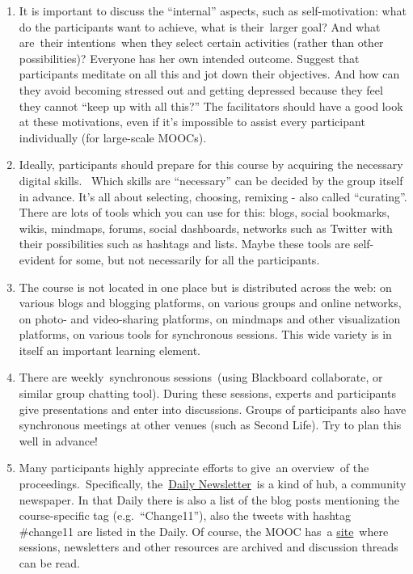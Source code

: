\begin{enumerate}
\def\labelenumi{\arabic{enumi}.}
\item
  It is important to discuss the ``internal'' aspects, such as
  self-motivation: what do the participants want to achieve, what is
  their~larger goal? And what are~their intentions~when they select
  certain activities (rather than other possibilities)? Everyone has her
  own intended outcome. Suggest that participants meditate on all this
  and jot down their objectives. And how can they avoid becoming
  stressed out and getting depressed because they feel they cannot
  ``keep up with all this?'' The facilitators should have a good look at
  these motivations, even if it's impossible to assist every participant
  individually (for large-scale MOOCs).
\item
  Ideally, participants should prepare for this course by acquiring the
  necessary digital skills. ~Which skills are ``necessary'' can be
  decided by the group itself in advance. It's all about selecting,
  choosing, remixing - also called ``curating''. There are lots of tools
  which you can use for this: blogs, social bookmarks, wikis, mindmaps,
  forums, social dashboards, networks such as Twitter with their
  possibilities such as hashtags and lists. Maybe these tools are
  self-evident for some, but not necessarily for all the participants.
\item
  The course is not located in one place but is distributed across the
  web: on various blogs and blogging platforms, on various groups and
  online networks, on photo- and video-sharing platforms, on mindmaps
  and other visualization platforms, on various tools for synchronous
  sessions. This wide variety is in itself an important learning
  element.
\item
  There are weekly~synchronous sessions~(using Blackboard collaborate,
  or similar group chatting tool). During these sessions, experts and
  participants give presentations and enter into discussions. Groups of
  participants also have synchronous meetings at other venues (such as
  Second Life). Try to plan this well in advance!
\item
  Many participants highly appreciate efforts to give~an overview~of the
  proceedings.~Specifically,
  the~\href{http://change.mooc.ca/newsletter.htm}{Daily Newsletter}~is a
  kind of hub, a community newspaper. In that Daily there is also a list
  of the blog posts mentioning the course-specific tag
  (e.g.~``Change11''), also the tweets with hashtag \#change11 are
  listed in the Daily. Of course, the MOOC has~a
  \href{http://change.mooc.ca/index.html}{site}~where sessions,
  newsletters and other resources are archived and discussion threads
  can be read.
\end{enumerate}

